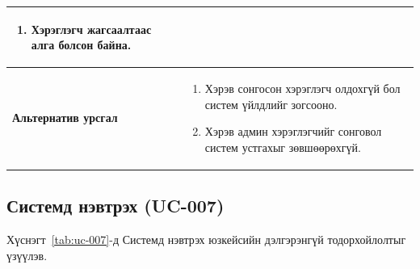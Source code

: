 \begin{table}[H]
\begin{tabular}{|p{3.8cm}|p{10.2cm}|}
\begin{enumerate}
            \item Хэрэглэгч жагсаалтаас алга болсон байна.
        \end{enumerate}
        \\ \hline
        \textbf{Альтернатив урсгал} &
        \begin{enumerate}
            \item Хэрэв сонгосон хэрэглэгч олдохгүй бол систем үйлдлийг зогсооно.
            \item Хэрэв админ хэрэглэгчийг сонговол систем устгахыг зөвшөөрөхгүй.
        \end{enumerate}
        \\ \hline
    \end{tabular}
\end{table}

\subsection{Системд нэвтрэх (UC-007)}

Хүснэгт~\ref{tab:uc-007}-д Системд нэвтрэх юзкейсийн дэлгэрэнгүй тодорхойлолтыг үзүүлэв.

